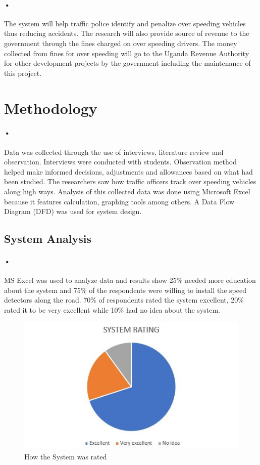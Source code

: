 \documentclass[12pt]{report}
\begin{document}
\paragraph{•}
The system will help traffic police identify and penalize over speeding vehicles thus reducing accidents. The research will also provide source of revenue to the government through the fines charged on over speeding drivers. The money collected from fines for over speeding will go to the Uganda Revenue Authority for other development projects by the government including the maintenance of this project.
\section{Methodology}
\paragraph{•}
Data was collected through the use of interviews, literature review and observation. Interviews were conducted with students. Observation method helped make informed decisions, adjustments and allowances based on what had been studied. The researchers saw how traffic officers track over speeding vehicles along high ways. Analysis of this collected data was done using Microsoft Excel because it features calculation, graphing tools among others. A Data Flow Diagram (DFD) was used for system design.
\subsection{System Analysis}
\paragraph{•}
MS Excel was used to analyze data and results show 25\% needed more education about the system and 75\% of the respondents were willing to install the speed detectors along the road. 70\% of respondents rated the system excellent, 20\% rated it to be very excellent while 10\% had no idea about the system.
\begin{figure}[ht]
\includegraphics[]{Piechart}
\caption{How the System was rated}
\end{figure}
\end{document}

